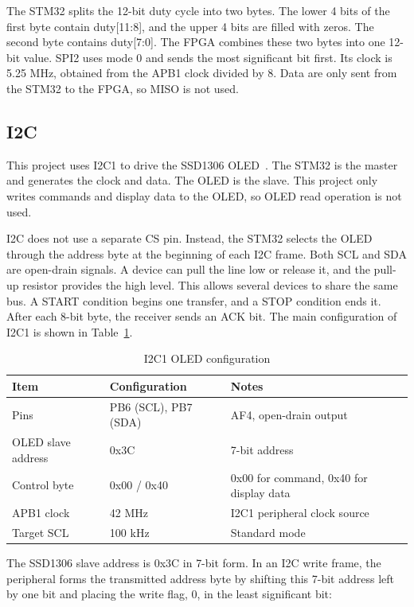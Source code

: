 \documentclass[12pt, a4paper]{report}
\begin{document}
The STM32 splits the 12-bit duty cycle into two bytes. The lower 4 bits of the first byte contain duty[11:8], and the upper 4 bits are filled with zeros. The second byte contains duty[7:0]. The FPGA combines these two bytes into one 12-bit value. SPI2 uses mode 0 and sends the most significant bit first. Its clock is 5.25 MHz, obtained from the APB1 clock divided by 8. Data are only sent from the STM32 to the FPGA, so MISO is not used.


\subsection{I2C}

This project uses I2C1 to drive the SSD1306 OLED~\cite{ssd1306}. The STM32 is the master and generates the clock and data. The OLED is the slave. This project only writes commands and display data to the OLED, so OLED read operation is not used.

I2C does not use a separate CS pin. Instead, the STM32 selects the OLED through the address byte at the beginning of each I2C frame. Both SCL and SDA are open-drain signals. A device can pull the line low or release it, and the pull-up resistor provides the high level. This allows several devices to share the same bus. A START condition begins one transfer, and a STOP condition ends it. After each 8-bit byte, the receiver sends an ACK bit. The main configuration of I2C1 is shown in Table~\ref{tab:i2c_config}.
\begin{table}[H]
\centering
\caption{I2C1 OLED configuration}
\label{tab:i2c_config}
\small
\begin{tabular}{@{}p{}p{}p{}@{}}
\toprule
Item & Configuration & Notes \\
\midrule
Pins & PB6 (SCL), PB7 (SDA) & AF4, open-drain output \\
OLED slave address & 0x3C & 7-bit address \\
Control byte & 0x00 / 0x40 & 0x00 for command, 0x40 for display data \\
APB1 clock & 42 MHz & I2C1 peripheral clock source \\
Target SCL & 100 kHz & Standard mode \\
\bottomrule
\end{tabular}
\end{table}

The SSD1306 slave address is 0x3C in 7-bit form. In an I2C write frame, the peripheral forms the transmitted address byte by shifting this 7-bit address left by one bit and placing the write flag, 0, in the least significant bit:
\end{document}
